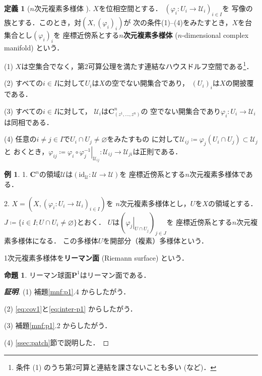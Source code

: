 \documentclass[11pt, a4paper, dvipdfmx, draft]{jsarticle}
\theoremstyle{definition}
\newtheorem{Definition}[Axiom]{定義}
\newtheorem{Proposition}[Axiom]{命題}
\newtheorem{Example}[Axiom]{例}
\newcommand{\cc}{\mathbf{C}}
\newcommand{\pp}{\mathbf{P}}
\newcommand{\mcal}{\mathcal}
\newcommand{\pphi}{\varphi} %
\newcommand{\UU}{\mcal{U}}
\newcommand{\emp}{\varnothing}
\newcommand{\ceq}{\coloneqq}
\newcommand{\sbs}{\subset}
\newcommand{\mapres}[2]{\left. #1 \right|_{#2}}
\newcommand{\id}{\mathrm{id}}
\theoremstyle{mystyle}
\numberwithin{equation}{section} %
\begin{document}
\begin{Definition}[$n$次元複素多様体 {\cite[定義4.1]{ogs}}]
    $X$を位相空間とする．
    $(\pphi_{i}\colon U_{i}\to \UU_{i})_{i\in I}$を
    写像の族とする．このとき，対$(X,(\pphi_{i})_{i})$が
    次の条件(1)--(4)をみたすとき，$X$を台集合とし$(\pphi_{i})_i$を
    座標近傍系とする\textbf{$n$次元複素多様体} ($n$-dimensional complex manifold) という．

    (1) 
    $X$は空集合でなく，第2可算公理を満たす連結なハウスドルフ空間である\footnote{
        条件 (1) のうち第2可算と連結を課さないことも多い (\cite{kobayashi1}など)．}．

    (2) 
    すべての$i\in I$に対して$U_i$は$X$の空でない開集合であり，
    $(U_i)_i$は$X$の開披覆である．

    (3) 
    すべての$i\in I$に対して，
    $\UU_i$は$\cc^{n}_{(z^{1},\dots,z^{n})}$の
    空でない開集合であり$\pphi_{i}\colon U_i\to\UU_i$は同相である．

    (4) 
    任意の$i\neq j \in I$で$U_i\cap U_j \neq \emp$をみたすもの
    に対して$\UU_{ij}\ceq \pphi_j(U_i\cap U_j)\sbs \UU_j$と
    おくとき，$\pphi_{ij}\ceq 
    \mapres{\pphi_{i}\circ\pphi_{j}^{-1}}{\UU_{ij}}
    \colon 
    \UU_{ij}\to\UU_{ji}$は正則である．
\end{Definition}

\begin{Example}\label{ex:openR}
    1. 
    $\cc^n$の領域$\UU$は$(\id_{\UU}\colon\UU\to\UU)$を
    座標近傍系とする$n$次元複素多様体である．

    2. 
    $X=(X, (\pphi_{i}\colon U_{i}\to \UU_{i})_{i\in I})$を
    $n$次元複素多様体とし，$U$を$X$の領域とする．
    $J\coloneqq\{i\in I; U\cap U_i \neq \emp\}$とおく．
    $U$は$(\mapres{\pphi_{j}}{U\cap U_{j}})_{j\in J}$を
    座標近傍系とする$n$次元複素多様体になる．
    この多様体$U$を開部分（複素）多様体という．
\end{Example}

1次元複素多様体を\textbf{リーマン面} (Riemann surface) という．

\begin{Proposition}
    リーマン球面$\pp^1$はリーマン面である．    
\end{Proposition}

\begin{proof}[\bf{証明}]
    (1) 
    補題\ref{mnf:p1}.4 からしたがう．

    (2) 
    \eqref{eq:cov1}と\eqref{eq:inter-p1} からしたがう．

    (3) 
    補題\ref{mnf:p1}.2 からしたがう．

    (4) 
    \ref{ssec:patch}節で説明した．
\end{proof}
\end{document}
